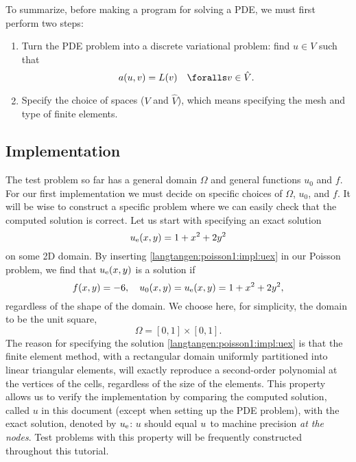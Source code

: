 To summarize, before making a \fenics{} program for solving a PDE,
we must first perform two steps:
\begin{enumerate}
  \item Turn the PDE problem into a discrete variational problem: find
  $u \in V$ such that
  \begin{equation}
     a(u,v) = L(v)\quad\foralls v\in \hat{V}.
  \end{equation}

  \item Specify the choice of spaces ($V$ and $\hat V$), which means
  specifying the mesh and type of finite elements.
\end{enumerate}

\subsection{Implementation}
\label{langtangen:poisson1:impl}

The test problem so far has a general domain $\Omega$ and general functions
$u_0$ and $f$. For our first implementation we must decide on specific
choices of $\Omega$, $u_0$, and $f$.
It will be wise to construct a specific problem where we can easily
check that the computed solution is correct. Let us start with
specifying an exact solution
\begin{equation}
\label{langtangen:poisson1:impl:uex}
u_{\rm e}(x, y) = 1 +x^2 + 2y^2
\end{equation}
on some 2D domain.  By inserting \eqref{langtangen:poisson1:impl:uex} in
our Poisson problem, we find that $u_{\rm e}(x,y)$ is a solution if
\[ f(x,y) = -6,\quad u_0(x,y)=u_{\rm e}(x,y)=1 + x^2 + 2y^2,\]
regardless of the shape of the domain. We choose here, for simplicity,
the domain to be the unit square,
\[ \Omega = [0,1]\times [0,1] .\]
The reason for specifying the solution \eqref{langtangen:poisson1:impl:uex}
is that the finite element method, with a rectangular domain uniformly
partitioned into linear triangular elements, will exactly reproduce a
second-order polynomial at the vertices of the cells, regardless of
the size of the elements. This property allows us to verify the
implementation by comparing the computed solution, called $u$ in this
document (except when setting up the PDE problem), with the exact
solution, denoted by $u_{\rm e}$: $u$ should equal
$u_{\rm}$ to machine precision \emph{at the nodes}.
Test problems with this property will be frequently constructed
throughout this tutorial.

